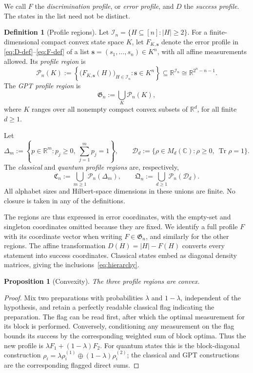 \documentclass[a4paper,11pt,onecolumn,unpublished]{quantumarticle}
\newtheorem{proposition}[theorem]{Proposition}
\theoremstyle{definition}
\newtheorem{definition}[theorem]{Definition}
\newcommand{\Tr}{\operatorname{Tr}}
\newcommand{\R}{\mathbb R}
\newcommand{\1}{\mathbf 1}
\newcommand{\Creg}{\mathfrak C}
\newcommand{\Qreg}{\mathfrak Q}
\newcommand{\Greg}{\mathfrak G}
\begin{document}
We call $F$ the \emph{discrimination profile}, or \emph{error profile}, and $D$
the \emph{success profile}. The states in the list need not be distinct.

\begin{definition}[Profile regions]\label{def:profile-regions}
Let $\mathcal I_n=\{H\subseteq[n]:|H|\ge2\}$. For a finite-dimensional compact
convex state space $K$, let $F_{K,\mathbf s}$ denote the error profile in
\eqref{eq:D-def}--\eqref{eq:F-def} of a list
$\mathbf s=(s_1,\ldots,s_n)\in K^n$, with all affine measurements allowed. Its
\emph{profile region} is
\begin{equation}\label{eq:fixed-space-region}
 \mathcal P_n(K):=
 \left\{\bigl(F_{K,\mathbf s}(H)\bigr)_{H\in\mathcal I_n}:
       \mathbf s\in K^n\right\}
 \subseteq\R^{\mathcal I_n}\cong\R^{2^n-n-1}.
\end{equation}
The \emph{GPT profile region} is
\begin{equation}\label{eq:Greg-definition}
 \Greg_n:=\bigcup_K\mathcal P_n(K),
\end{equation}
where $K$ ranges over all nonempty compact convex subsets of $\R^d$, for all
finite $d\ge1$.

Let
\[
 \Delta_m:=\left\{p\in\R^m:p_j\ge0,\ \sum_{j=1}^mp_j=1\right\},
 \qquad
 \mathcal D_d:=\{\rho\in M_d(\mathbb C):\rho\ge0,\ \Tr\rho=1\}.
\]
The \emph{classical} and \emph{quantum profile regions} are, respectively,
\begin{equation}\label{eq:Creg-Qreg-definition}
 \Creg_n:=\bigcup_{m\ge1}\mathcal P_n(\Delta_m),
 \qquad
 \Qreg_n:=\bigcup_{d\ge1}\mathcal P_n(\mathcal D_d).
\end{equation}
All alphabet sizes and Hilbert-space dimensions in these unions are finite.
No closure is taken in any of the definitions.
\end{definition}

The regions are thus expressed in error coordinates, with the empty-set and
singleton coordinates omitted because they are fixed. We identify a full
profile $F$ with its coordinate vector when writing $F\in\Greg_n$, and
similarly for the other regions. The affine transformation $D(H)=|H|-F(H)$
converts every statement into success coordinates. Classical states embed as
diagonal density matrices, giving the inclusions~\eqref{eq:hierarchy}.

\begin{proposition}[Convexity]\label{prop:convex}
The three profile regions are convex.
\end{proposition}
\begin{proof}
Mix two preparations with probabilities $\lambda$ and $1-\lambda$, independent
of the hypothesis, and retain a perfectly readable classical flag indicating
the preparation. The flag can be read first, after which the optimal measurement
for its block is performed. Conversely, conditioning any measurement on the
flag bounds its success by the corresponding weighted sum of block optima.
Thus the new profile is $\lambda F_1+(1-\lambda)F_2$.
For quantum states this is the block-diagonal construction
$\rho_i=\lambda\rho_i^{(1)}\oplus(1-\lambda)\rho_i^{(2)}$; the classical and
GPT constructions are the corresponding flagged direct sums.
\end{proof}
\end{document}
